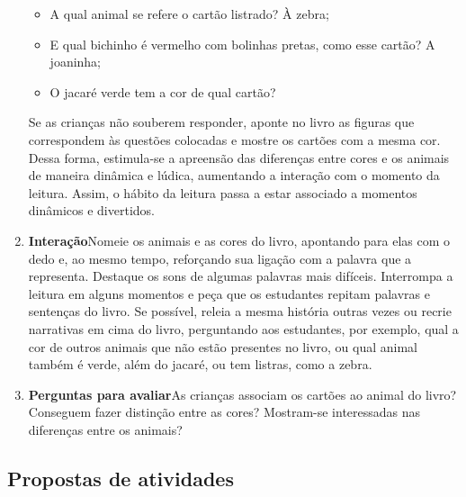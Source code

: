 \documentclass[11pt]{extarticle}
\begin{document}
\begin{enumerate}
\begin{itemize}
\item A qual animal se refere o cartão listrado? À zebra;
\item E qual bichinho é vermelho com bolinhas pretas, como esse cartão? A joaninha; 
\item O jacaré verde tem a cor de qual cartão?
\end{itemize}

Se as crianças não souberem responder, aponte no livro as figuras que correspondem às questões colocadas e mostre os cartões com a mesma cor. 
Dessa forma, estimula-se a apreensão das diferenças entre cores e os animais de maneira dinâmica e lúdica, aumentando a interação com o momento da leitura. Assim, o hábito da leitura passa a estar associado a momentos dinâmicos e divertidos.


\item \textbf{Interação}\quad Nomeie os animais e as cores
do livro, apontando para elas com o dedo e, ao mesmo tempo, reforçando sua ligação com a palavra que a representa. 
Destaque os sons de algumas 
palavras mais difíceis. Interrompa a leitura em alguns momentos e peça que 
os estudantes repitam palavras e sentenças do livro. Se possível, 
releia a mesma história outras vezes ou recrie narrativas em cima do livro, perguntando aos estudantes, por exemplo, qual a cor de outros animais que não estão presentes no livro, ou qual animal também é verde, além do jacaré, ou tem listras, como a zebra.

\item \textbf{Perguntas para avaliar}\quad As crianças associam os cartões ao animal do livro? Conseguem fazer distinção entre as cores? Mostram-se interessadas nas diferenças entre os animais?
\end{enumerate}


\subsection{Propostas de atividades}

\end{document}
